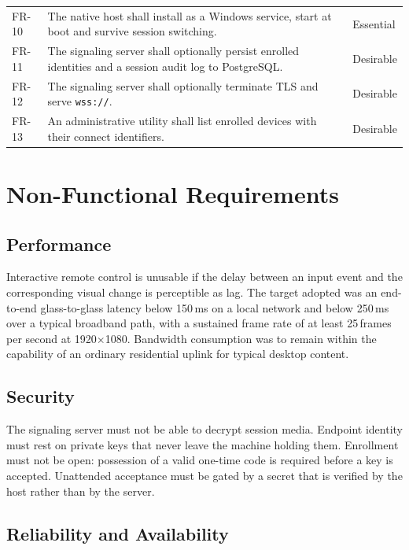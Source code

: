 \begin{table}[H]
\begin{tabular}{@{}p{1.4cm}p{8.4cm}p{2.6cm}@{}}
FR-10 & The native host shall install as a Windows service, start at boot and survive session switching. & Essential \\
FR-11 & The signaling server shall optionally persist enrolled identities and a session audit log to PostgreSQL. & Desirable \\
FR-12 & The signaling server shall optionally terminate TLS and serve \texttt{wss://}. & Desirable \\
FR-13 & An administrative utility shall list enrolled devices with their connect identifiers. & Desirable \\
\bottomrule
\end{tabular}
\end{table}

\section{Non-Functional Requirements}

\subsection{Performance}

Interactive remote control is unusable if the delay between an input event and
the corresponding visual change is perceptible as lag. The target adopted was an
end-to-end glass-to-glass latency below 150\,ms on a local network and below
250\,ms over a typical broadband path, with a sustained frame rate of at least
25\,frames per second at 1920$\times$1080. Bandwidth consumption was to remain
within the capability of an ordinary residential uplink for typical desktop
content.

\subsection{Security}

The signaling server must not be able to decrypt session media. Endpoint
identity must rest on private keys that never leave the machine holding them.
Enrollment must not be open: possession of a valid one-time code is required
before a key is accepted. Unattended acceptance must be gated by a secret that
is verified by the host rather than by the server.

\subsection{Reliability and Availability}

